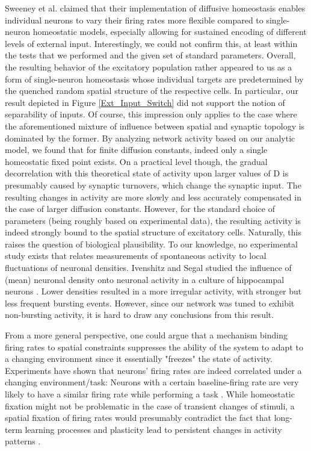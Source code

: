 \documentclass[10pt,a4paper]{article}
\begin{document}
Sweeney et al. claimed that their implementation of diffusive homeostasis enables individual neurons to vary their firing rates more flexible compared to single-neuron homeostatic models, especially allowing for sustained encoding of different levels of external input. Interestingly, we could not confirm this, at least within the tests that we performed and the given set of standard parameters. Overall, the resulting behavior of the excitatory population rather appeared to us as a form of single-neuron homeostasis whose individual targets are predetermined by the quenched random spatial structure of the respective cells. In particular, our result depicted in Figure \ref{Ext_Input_Switch} did not support the notion of separability of inputs. Of course, this impression only applies to the case where the aforementioned mixture of influence between spatial and synaptic topology is dominated by the former. By analyzing network activity based on our analytic model, we found that for finite diffusion constants, indeed only a single homeostatic fixed point exists. On a practical level though, the gradual decorrelation with this theoretical state of activity upon larger values of $\mathrm{D}$ is presumably caused by synaptic turnovers, which change the synaptic input. The resulting changes in activity are more slowly and less accurately compensated in the case of larger diffusion constants. However, for the standard choice of parameters (being roughly based on experimental data), the resulting activity is indeed strongly bound to the spatial structure of excitatory cells. Naturally, this raises the question of biological plausibility. To our knowledge, no experimental study exists that relates measurements of spontaneous activity to local fluctuations of neuronal densities. Ivenshitz and Segal studied the influence of (mean) neuronal density onto neuronal activity in a culture of hippocampal neurons \cite{Ivenshitz_2010}. Lower densities resulted in a more irregular activity, with stronger but less frequent bursting events. However, since our network was tuned to exhibit non-bursting activity, it is hard to draw any conclusions from this result.

From a more general perspective, one could argue that a mechanism binding firing rates to spatial constraints suppresses the ability of the system to adapt to a changing environment since it essentially "freezes" the state of activity. Experiments have shown that neurons' firing rates are indeed correlated under a changing environment/task: Neurons with a certain baseline-firing rate are very likely to have a similar firing rate while performing a task \cite{Buzsaki_Fir_Rates_2014}. While homeostatic fixation might not be problematic in the case of transient changes of stimuli, a spatial fixation of firing rates would presumably contradict the fact that long-term learning processes and plasticity lead to persistent changes in activity patterns \cite{Lever_Long_Term_Plast_2002}.
\end{document}
